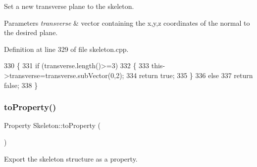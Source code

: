 Set a new transverse plane to the skeleton. 


\begin{DoxyParams}{Parameters}
{\em transverse} & vector containing the x,y,z coordinates of the normal to the desired plane. \\
\hline
\end{DoxyParams}


Definition at line 329 of file skeleton.\+cpp.


\begin{DoxyCode}
330 \{
331     \textcolor{keywordflow}{if} (transverse.length()>=3)
332     \{
333         this->transverse=transverse.subVector(0,2);
334         \textcolor{keywordflow}{return} \textcolor{keyword}{true};
335     \}
336     \textcolor{keywordflow}{else}
337         \textcolor{keywordflow}{return} \textcolor{keyword}{false};
338 \}
\end{DoxyCode}
\mbox{\label{classassistive__rehab_1_1Skeleton_ad58ea53a165abc3f39a3c46594f0560f}} 
\subsubsection{\texorpdfstring{to\+Property()}{toProperty()}}
{\footnotesize\ttfamily Property Skeleton\+::to\+Property (\begin{DoxyParamCaption}{ }\end{DoxyParamCaption})\hspace{0.3cm}{\ttfamily [virtual]}}



Export the skeleton structure as a property. 

